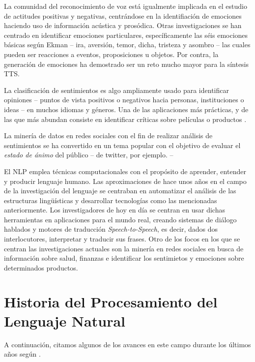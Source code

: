 La comunidad del reconocimiento de voz está igualmente implicada en el estudio
de actitudes positivas y negativas, centrándose en la identifiación de emociones
haciendo uso de información acústica y %
prosódica. Otras investigaciones se han centrado en identificar emociones
particulares, específicamente las séis emociones básicas según Ekman -- ira,
aversión, temor, dicha, tristeza y asombro -- las cuales pueden ser reacciones a
eventos, proposiciones u objetos. Por contra, la generación de emociones ha
demostrado ser un reto mucho mayor para la síntesis \ac{TTS}.

La clasificación de sentimientos es algo ampliamente usado para identificar
opiniones -- puntos de vista positivos o negativos hacia personas, instituciones
o ideas -- en muchos idiomas y géneros. Una de las aplicaciones más prácticas, y
de las que más abundan consiste en identificar críticas sobre películas o
productos \cite{Pang:2002:TUS:1118693.1118704,Wang2014}.

La minería de datos en redes sociales con el fin de realizar análisis de
sentimientos se ha convertido en un tema popular con el objetivo de evaluar el
\emph{estado de ánimo} del público -- de twitter, por ejemplo. -- 

El \ac{NLP} emplea técnicas computacionales con el propósito de aprender,
entender y producir lenguaje humano. Las aproximaciones de hace unos años en el
campo de la investigación del lenguaje se centraban en automatizar el análisis
de las estructuras lingüísticas y desarrollar tecnologías como las mencionadas
anteriormente. Los investigadores de hoy en día se centran en usar dichas
herramientas en aplicaciones para el mundo real, creando sistemas de diálogo
hablados y motores de traducción \emph{Speech-to-Speech}, es decir, dados dos
interlocutores, interpretar y traducir sus frases. Otro de los focos en los que
se centran las investigaciones actuales son la minería en redes sociales en
busca de información sobre salud, finanzas e identificar los sentimietos y
emociones sobre determinados productos.

\section{Historia del Procesamiento del Lenguaje Natural}
\label{sec:currentnlp}

A continuación, citamos algunos de los avances en este campo durante los últimos
años según \citet{Hirschberg2015}.

